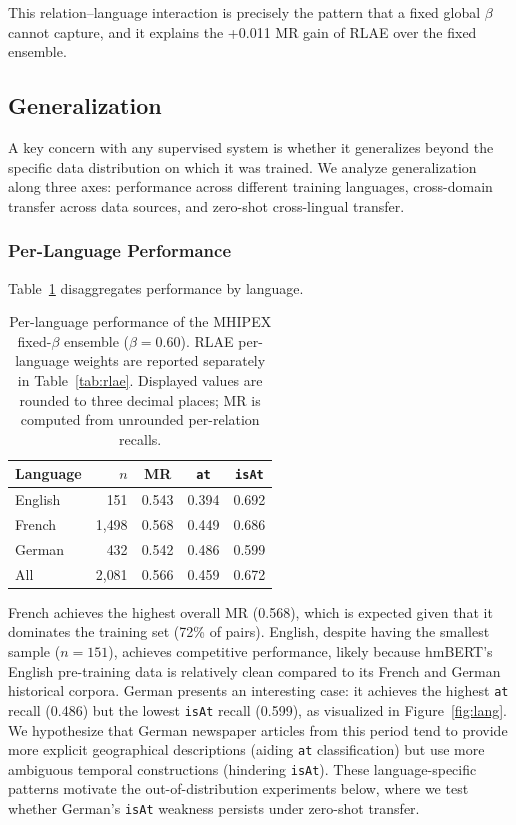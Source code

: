 \documentclass[11pt,a4paper]{article}
\begin{document}
This relation--language interaction is precisely the pattern that a fixed global $\beta$ cannot capture, and it explains the +0.011 MR gain of RLAE over the fixed ensemble.

\subsection{Generalization}
\label{sec:generalization}

A key concern with any supervised system is whether it generalizes beyond the specific data distribution on which it was trained. We analyze generalization along three axes: performance across different training languages, cross-domain transfer across data sources, and zero-shot cross-lingual transfer.

\subsubsection{Per-Language Performance}
\label{sec:lang}

Table~\ref{tab:lang} disaggregates performance by language.

\begin{table}[t]
\centering
\caption{Per-language performance of the MHIPEX fixed-$\beta$ ensemble ($\beta=0.60$). RLAE per-language weights are reported separately in Table~\ref{tab:rlae}. Displayed values are rounded to three decimal places; MR is computed from unrounded per-relation recalls.}
\label{tab:lang}
\begin{tabular}{lrccc}
\toprule
\textbf{Language} & $n$ & \textbf{MR} & \textbf{\texttt{at}} & \textbf{\texttt{isAt}} \\
\midrule
English & 151 & 0.543 & 0.394 & 0.692 \\
French & 1{,}498 & 0.568 & 0.449 & 0.686 \\
German & 432 & 0.542 & 0.486 & 0.599 \\
\midrule
All & 2{,}081 & 0.566 & 0.459 & 0.672 \\
\bottomrule
\end{tabular}
\end{table}

French achieves the highest overall MR (0.568), which is expected given that it dominates the training set (72\% of pairs). English, despite having the smallest sample ($n=151$), achieves competitive performance, likely because hmBERT's English pre-training data is relatively clean compared to its French and German historical corpora. German presents an interesting case: it achieves the highest \texttt{at} recall (0.486) but the lowest \texttt{isAt} recall (0.599), as visualized in Figure~\ref{fig:lang}. We hypothesize that German newspaper articles from this period tend to provide more explicit geographical descriptions (aiding \texttt{at} classification) but use more ambiguous temporal constructions (hindering \texttt{isAt}). These language-specific patterns motivate the out-of-distribution experiments below, where we test whether German's \texttt{isAt} weakness persists under zero-shot transfer.
\end{document}

